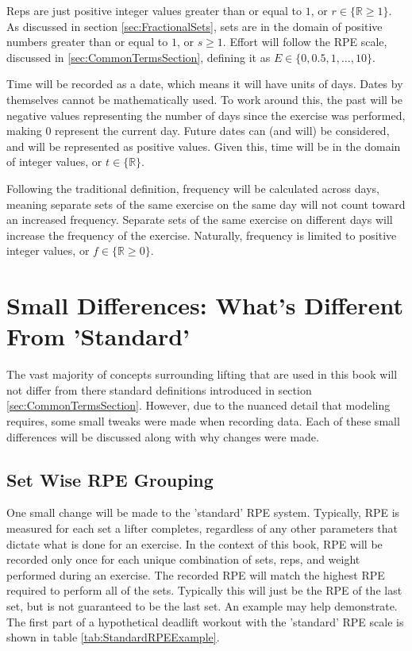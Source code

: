 Reps are just positive integer values greater than or equal to $1$, or $r\in \{ \mathbb{R}\ge 1 \}$. 
As discussed in section \ref{sec:FractionalSets}, sets are in the domain of positive numbers greater than or equal to $1$, or $s\ge 1$. Effort will follow the RPE scale, discussed in \ref{sec:CommonTermsSection}, defining it as $E\in \{0,0.5,1,...,10\}$.

Time will be recorded as a date, which means it will have units of days. Dates by themselves cannot be mathematically used. To work around this, the past will be negative values representing the number of days since the exercise was performed, making $0$ represent the current day. Future dates can (and will) be considered, and will be represented as positive values. Given this, time will be in the domain of integer values, or $t\in \{ \mathbb{R} \}$.

Following the traditional definition, frequency will be calculated across days, meaning separate sets of the same exercise on the same day will not count toward an increased frequency. Separate sets of the same exercise on different days will increase the frequency of the exercise. Naturally, frequency is limited to positive integer values, or $f\in \{ \mathbb{R}\ge 0 \}$.

\section{Small Differences: What's Different From 'Standard'}
\label{sec:SmallDifferencesSection}

The vast majority of concepts surrounding lifting that are used in this book will not differ from there standard definitions introduced in section \ref{sec:CommonTermsSection}. However, due to the nuanced detail that modeling requires, some small tweaks were made when recording data. Each of these small differences will be discussed along with why changes were made.

\subsection{Set Wise RPE Grouping}
\label{sec:SetWiseRPEGrouping}

One small change will be made to the 'standard' RPE system. Typically, RPE is measured for each set a lifter completes, regardless of any other parameters that dictate what is done for an exercise. In the context of this book, RPE will be recorded only once for each unique combination of sets, reps, and weight performed during an exercise. The recorded RPE will match the highest RPE required to perform all of the sets. Typically this will just be the RPE of the last set, but is not guaranteed to be the last set. An example may help demonstrate. The first part of a hypothetical deadlift workout with the 'standard' RPE scale is shown in table \ref{tab:StandardRPEExample}.

